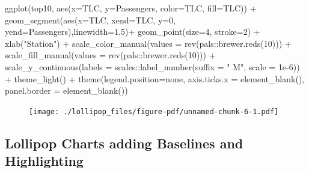 \documentclass[
  letterpaper,
  DIV=11,
  numbers=noendperiod]{scrreprt}
\newenvironment{Shaded}{\begin{snugshade}}{\end{snugshade}}
\newcommand{\AttributeTok}[1]{\textcolor[rgb]{0.40,0.45,0.13}{#1}}
\newcommand{\DecValTok}[1]{\textcolor[rgb]{0.68,0.00,0.00}{#1}}
\newcommand{\FloatTok}[1]{\textcolor[rgb]{0.68,0.00,0.00}{#1}}
\newcommand{\FunctionTok}[1]{\textcolor[rgb]{0.28,0.35,0.67}{#1}}
\newcommand{\NormalTok}[1]{\textcolor[rgb]{0.00,0.23,0.31}{#1}}
\newcommand{\SpecialCharTok}[1]{\textcolor[rgb]{0.37,0.37,0.37}{#1}}
\newcommand{\StringTok}[1]{\textcolor[rgb]{0.13,0.47,0.30}{#1}}
\begin{document}
\begin{Shaded}
\begin{Highlighting}[]
\FunctionTok{ggplot}\NormalTok{(top10, }\FunctionTok{aes}\NormalTok{(}\AttributeTok{x=}\NormalTok{TLC, }\AttributeTok{y=}\NormalTok{Passengers, }\AttributeTok{color=}\NormalTok{TLC, }\AttributeTok{fill=}\NormalTok{TLC)) }\SpecialCharTok{+}
  \FunctionTok{geom\_segment}\NormalTok{(}\FunctionTok{aes}\NormalTok{(}\AttributeTok{x=}\NormalTok{TLC, }\AttributeTok{xend=}\NormalTok{TLC, }\AttributeTok{y=}\DecValTok{0}\NormalTok{, }\AttributeTok{yend=}\NormalTok{Passengers),}\AttributeTok{linewidth=}\FloatTok{1.5}\NormalTok{)}\SpecialCharTok{+}
  \FunctionTok{geom\_point}\NormalTok{(}\AttributeTok{size=}\DecValTok{4}\NormalTok{, }\AttributeTok{stroke=}\DecValTok{2}\NormalTok{) }\SpecialCharTok{+}
  \FunctionTok{xlab}\NormalTok{(}\StringTok{"Station"}\NormalTok{) }\SpecialCharTok{+}
  \FunctionTok{scale\_color\_manual}\NormalTok{(}\AttributeTok{values =} \FunctionTok{rev}\NormalTok{(pals}\SpecialCharTok{::}\FunctionTok{brewer.reds}\NormalTok{(}\DecValTok{10}\NormalTok{))) }\SpecialCharTok{+}
  \FunctionTok{scale\_fill\_manual}\NormalTok{(}\AttributeTok{values =} \FunctionTok{rev}\NormalTok{(pals}\SpecialCharTok{::}\FunctionTok{brewer.reds}\NormalTok{(}\DecValTok{10}\NormalTok{))) }\SpecialCharTok{+}
  \FunctionTok{scale\_y\_continuous}\NormalTok{(}\AttributeTok{labels =}\NormalTok{ scales}\SpecialCharTok{::}\FunctionTok{label\_number}\NormalTok{(}\AttributeTok{suffix =} \StringTok{" M"}\NormalTok{, }\AttributeTok{scale =} \FloatTok{1e{-}6}\NormalTok{)) }\SpecialCharTok{+}
  \FunctionTok{theme\_light}\NormalTok{() }\SpecialCharTok{+}
  \FunctionTok{theme}\NormalTok{(}\AttributeTok{legend.position=}\StringTok{\textquotesingle{}none\textquotesingle{}}\NormalTok{,}
        \AttributeTok{axis.ticks.x =} \FunctionTok{element\_blank}\NormalTok{(),}
        \AttributeTok{panel.border =} \FunctionTok{element\_blank}\NormalTok{())}
\end{Highlighting}
\end{Shaded}

\begin{figure}[H]

{\centering \texttt{[image: ./lollipop\_files/figure-pdf/unnamed-chunk-6-1.pdf]}

}

\end{figure}

\hypertarget{lollipop-charts-adding-baselines-and-highlighting}{%
\subsection{Lollipop Charts adding Baselines and
Highlighting}\label{lollipop-charts-adding-baselines-and-highlighting}}
\end{document}
